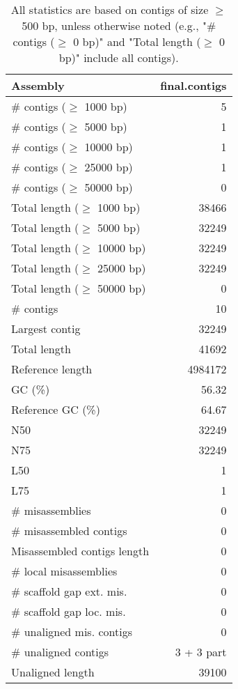 \documentclass[12pt,a4paper]{article}
\begin{document}
\begin{table}[ht]
\begin{center}
\caption{All statistics are based on contigs of size $\geq$ 500 bp, unless otherwise noted (e.g., "\# contigs ($\geq$ 0 bp)" and "Total length ($\geq$ 0 bp)" include all contigs).}
\begin{tabular}{|l*{1}{|r}|}
\hline
Assembly & final.contigs \\ \hline
\# contigs ($\geq$ 1000 bp) & 5 \\ \hline
\# contigs ($\geq$ 5000 bp) & 1 \\ \hline
\# contigs ($\geq$ 10000 bp) & 1 \\ \hline
\# contigs ($\geq$ 25000 bp) & 1 \\ \hline
\# contigs ($\geq$ 50000 bp) & 0 \\ \hline
Total length ($\geq$ 1000 bp) & 38466 \\ \hline
Total length ($\geq$ 5000 bp) & 32249 \\ \hline
Total length ($\geq$ 10000 bp) & 32249 \\ \hline
Total length ($\geq$ 25000 bp) & 32249 \\ \hline
Total length ($\geq$ 50000 bp) & 0 \\ \hline
\# contigs & 10 \\ \hline
Largest contig & 32249 \\ \hline
Total length & 41692 \\ \hline
Reference length & 4984172 \\ \hline
GC (\%) & 56.32 \\ \hline
Reference GC (\%) & 64.67 \\ \hline
N50 & 32249 \\ \hline
N75 & 32249 \\ \hline
L50 & 1 \\ \hline
L75 & 1 \\ \hline
\# misassemblies & 0 \\ \hline
\# misassembled contigs & 0 \\ \hline
Misassembled contigs length & 0 \\ \hline
\# local misassemblies & 0 \\ \hline
\# scaffold gap ext. mis. & 0 \\ \hline
\# scaffold gap loc. mis. & 0 \\ \hline
\# unaligned mis. contigs & 0 \\ \hline
\# unaligned contigs & 3 + 3 part \\ \hline
Unaligned length & 39100 \\ \hline

\end{tabular}
\end{center}
\end{table}
\end{document}
